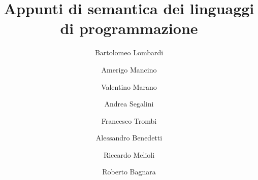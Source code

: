 \documentclass[12pt,a4]{book}
\begin{document}
\title{Appunti di semantica dei linguaggi di programmazione}
\author{Bartolomeo Lombardi \and Amerigo Mancino \and Valentino Marano
  \and Andrea Segalini \and Francesco Trombi \and Alessandro Benedetti
  \and Riccardo Melioli \and Roberto Bagnara}

\maketitle

\tableofcontents













\end{document}
